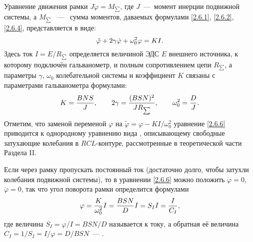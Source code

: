Уравнение движения рамки $J\ddot{\varphi} = M_{\scriptscriptstyle \sum}$, где $J$~---~момент инерции подвижной системы, а $M_{\scriptscriptstyle \sum}$ ~---~
сумма моментов, даваемых формулами \eqref{2.6.1}, \eqref{2.6.2}, \eqref{2.6.4}, представляется в виде:
\begin{equation}
	\eqmark{2.6.6}
	\ddot{\varphi} + 2\gamma \dot{\varphi} + \omega^2_{0}\varphi = KI.
\end{equation}
Здесь ток $I = E/R_{\scriptscriptstyle \sum}$ определяется величиной ЭДС $E$ внешнего источника, к которому
подключён гальванометр, и полным сопротивлением цепи $R_{\scriptscriptstyle \sum}$, а параметры $\gamma$, $\omega_0$
колебательной системы и коэффициент $K$ связаны с параметрами гальванометра
формулами:
\begin{equation}
	\eqmark{2.6.7}
	K = \frac{BNS}{J}, \qquad 2\gamma = \frac{(BSN)^2}{JR_{\scriptscriptstyle \sum}}, \qquad \omega^2_0 = \frac{D}{J}.
\end{equation}
Отметим, что заменой переменой $\varphi$ на $\tilde{\varphi} = \varphi - KI/\omega^2_0$ уравнение \eqref{2.6.6} приводится к однородному
уравнению вида , описывающему свободные затухающие колебания в
$RCL$-контуре, рассмотренные в теоретической части Раздела II.

Если через рамку пропускать постоянный ток (достаточно долго, чтобы затухли колебания подвижной
системы), то в уравнении \eqref{2.6.6} можно положить $\dot{\varphi} = 0$, $\ddot{\varphi} = 0$, так что угол поворота
рамки определится формулами
\begin{equation}
	\eqmark{2.6.8}
	\varphi = \frac{K}{\omega^2_0}I = \frac{BSN}{D}I = S_I I = \frac{I}{C_I},
\end{equation}
где величина $S_I = \varphi/I = BSN/D$ называется  к току, а
обратная её величина $C_I = 1/S_I = I/\varphi = D/BSN$~--- .

